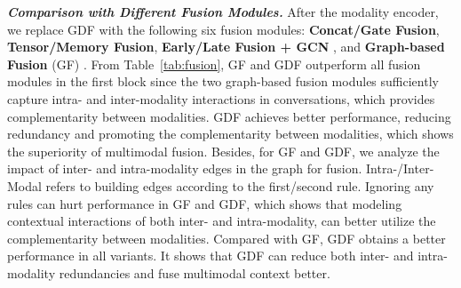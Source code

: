 \documentclass{article}
\begin{document}
 \textit{\textbf{Comparison with Different Fusion Modules.}}
After the modality encoder, 
we replace GDF with the following six fusion modules:
\textbf{Concat/Gate Fusion}, \textbf{Tensor/Memory Fusion}\cite{DBLP:conf/acl/MorencyLZLSL18,DBLP:conf/aaai/ZadehLMPCM18},
\textbf{Early/Late Fusion + GCN }\cite{DBLP:conf/acl/HuLZJ20}, and  
\textbf{Graph-based Fusion} (GF)   \cite{DBLP:conf/acl/HuLZJ20}.
From Table~\ref{tab:fusion}, GF and GDF outperform all fusion modules in the first block since the two graph-based fusion modules sufficiently capture intra- and inter-modality interactions in conversations, which provides complementarity between modalities. 
GDF achieves better performance, reducing  redundancy  and  promoting the  complementarity  between  modalities, which shows the superiority of multimodal fusion. Besides, for GF and GDF, we analyze the impact of inter- and intra-modality edges in the graph for fusion.
{Intra-}/{Inter-Modal} refers to building edges according to the first/second rule.
Ignoring any rules can hurt performance in GF and GDF, which shows that modeling contextual interactions of both inter- and intra-modality, can better utilize the complementarity  between modalities.
Compared with GF, GDF obtains a better performance in all variants. It shows that GDF can reduce both inter- and intra-modality redundancies and fuse multimodal context better.
\end{document}
